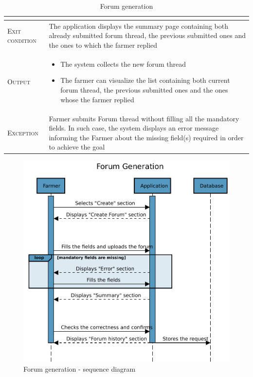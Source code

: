 \begin{table}[H]
\begin{tabular}{|l|p{}|}
\begin{itemize}
                                        \end{itemize}\\
        \hline %
        \textsc{Exit condition}    &  The application displays the summary page containing both already submitted forum thread, the previous submitted ones and the ones to which the farmer replied\\
    	\hline %
    	\textsc{Output}             &  \begin{itemize}
    	    \item The system collects the new forum thread
    	    \item The farmer can visualize the list containing both current forum thread, the previous submitted ones and the ones whose the farmer replied
    	\end{itemize}\\
    	\hline %
    	\textsc{Exception}         &   Farmer submits Forum thread without filling all the mandatory fields. In such case, the system displays an error message informing the Farmer about the missing field(s) required in order to achieve the goal\\
    	\hline %
        
    \end{tabular}


    \caption{\label{tab:Forum_generation}Forum generation}
\end{table}

\begin{figure}[H]
	\centering
    \includegraphics[page=1, width=\textwidth]{Images/SeqDiag/forum_generation_seq_diag.pdf}
	\caption{\label{fig:forum_generation_seq_diag}Forum generation - sequence diagram}
\end{figure}

